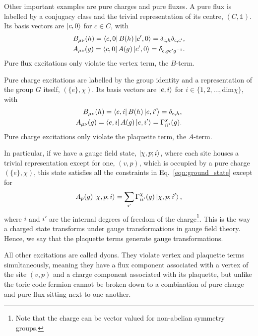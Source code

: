 \documentclass[two column]{article}
\begin{document}
Other important examples are pure charges and pure fluxes. A pure flux is labelled by a conjugacy class and the trivial representation of its centre, $(C, \mathbb{1})$. Its basis vectors are $\ket{c, 0}$ for $c \in C$, with
\begin{equation}
    \begin{split}
        B_{\mu\nu}{(h)}=\bra{c, 0} B{(h)} \ket{c', 0} = \delta_{c, h} \delta_{c, c'}, \\
        A_{\mu\nu}{(g)}= \bra{c, 0} A{(g)} \ket{c', 0} = \delta_{c,gc'g^{-1}}.
    \end{split}
\end{equation}
Pure flux excitations only violate the vertex term, the $B$-term.

Pure charge excitations are labelled by the group identity and a representation of the group $G$ itself, $(\{e\}, \chi)$. Its basis vectors are $\ket{e, i}$ for $i \in \{1, 2, \ldots, \text{dim}\chi\}$, with
\begin{equation}
    \begin{split}
        B_{\mu\nu}{(h)}=\bra{e, i} B{(h)} \ket{e, i'} = \delta_{e, h},\\
        A_{\mu\nu}{(g)} = \bra{e, i} A{(g)} \ket{e, i'} = \Gamma^\chi_{ii'}(g).
    \end{split}
\end{equation}
Pure charge excitations only violate the plaquette term, the $A$-term.


In particular, if we have a gauge field state, $\ket{\chi, p; i}$, where each site houses a trivial representation except for one, $(v, p)$, which is occupied by a pure charge $(\{e\}, \chi)$, this state satisfies all the constraints in Eq.~\eqref{eqn:ground_state} except for
\begin{equation}
    A_p{(g)}\ket{\chi, p; i} = \sum_{i'} \Gamma^\chi_{ii'}(g)\ket{\chi, p; i'},\label{eqn:tranfs}
\end{equation}
where $i$ and $i'$ are the internal degrees of freedom of the charge\footnote{Note that the charge can be vector valued for non-abelian symmetry groups.}.
This is the way a charged state transforms under gauge transformations in gauge field theory. Hence, we say that the plaquette terms generate gauge transformations.

All other excitations are called dyons. They violate vertex and plaquette terms simultaneously, meaning they have a flux component associated with a vertex of the site $(v,p)$ and a charge component associated with its plaquette, but unlike the toric code fermion cannot be broken down to a combination of pure charge and pure flux sitting next to one another.
\end{document}

